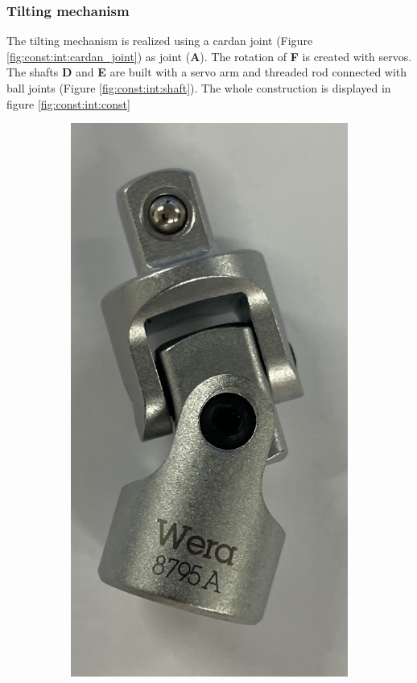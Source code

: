 \subsubsection*{Tilting mechanism}

The tilting mechanism is realized using a cardan joint (Figure \ref{fig:const:int:cardan_joint}) as joint (\textbf{A}). The rotation of \textbf{F} is created with servos. The shafts \textbf{D} and \textbf{E} are built with a servo arm and threaded rod connected with ball joints (Figure \ref{fig:const:int:shaft}). The whole construction is displayed in figure \ref{fig:const:int:const}
%
\begin{figure}[ht]
  \begin{subfigure}[b]{0.174\textwidth}
    \includegraphics[width=\textwidth]{src/assets/pictures/construction/cardan_joint.JPG}

\end{subfigure}
\end{figure}
